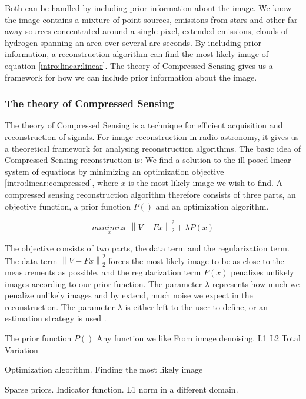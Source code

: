 Both can be handled by including prior information about the image. We know the image contains a mixture of point sources, emissions from stars and other far-away sources concentrated around a single pixel, extended emissions, clouds of hydrogen spanning an area over several arc-seconds. By including prior information, a reconstruction algorithm can find the most-likely image of equation \eqref{intro:linear:linear}. The theory of Compressed Sensing\cite{candes2006robust,donoho2006compressed} gives us a framework for how we can include prior information about the image. 

\subsubsection{The theory of Compressed Sensing}
The theory of Compressed Sensing is a technique for efficient acquisition and reconstruction of signals. For image reconstruction in radio astronomy, it gives us a theoretical framework for analysing reconstruction algorithms. The basic idea of Compressed Sensing reconstruction is: We find a solution to the ill-posed linear system of equations by minimizing an optimization objective \eqref{intro:linear:compressed}, where $x$ is the most likely image we wish to find. A compressed sensing reconstruction algorithm therefore consists of three parts, an objective function, a prior function $P()$ and an optimization algorithm.

\begin{equation}\label{intro:linear:compressed}
\underset{x}{minimize} \: \left \| V - Fx \right \|_2^2 + \lambda P(x)
\end{equation}

The objective consists of two parts, the data term and the regularization term. The data term $\left \| V - Fx \right \|_2^2$ forces the most likely image to be as close to the measurements as possible, and the regularization term $P(x)$ penalizes unlikely images according to our prior function. The parameter $\lambda$ represents how much we penalize unlikely images and by extend, much noise we expect in the reconstruction. The parameter $\lambda$ is either left to the user to define, or an estimation strategy is used \cite{miller1970least}.

The prior function $P()$
Any function we like
From image denoising. L1 L2
Total Variation

Optimization algorithm. Finding the most likely image

Sparse priors. Indicator function. 
L1 norm in a different domain.



